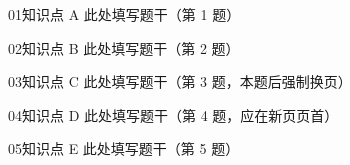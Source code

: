 \documentclass[12pt]{ctexart}
\begin{document}
	\setlength{\parindent}{0pt}
	
	\begin{problem}{01}{知识点 A}
		此处填写题干（第 1 题）
	\end{problem}
	
	\begin{problem}{02}{知识点 B}
		此处填写题干（第 2 题）
	\end{problem}
	
	\begin{problem}{03}{知识点 C}
		此处填写题干（第 3 题，本题后强制换页）
	\end{problem}
	
	\begin{problem}{04}{知识点 D}
		此处填写题干（第 4 题，应在新页页首）
	\end{problem}
	
	\begin{problem}{05}{知识点 E}
		此处填写题干（第 5 题）
	\end{problem}
	
\end{document}
